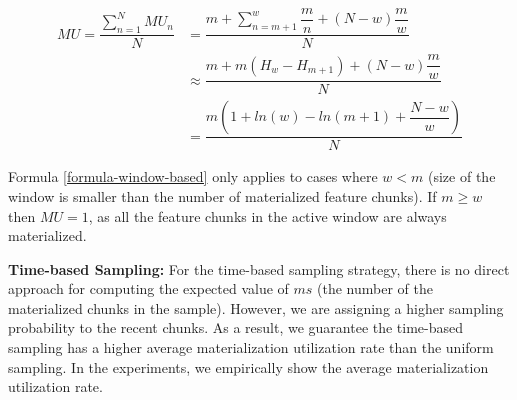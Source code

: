 \begin{equation} \label{formula-window-based}
\begin{aligned}
MU=\dfrac{\sum\limits_{n=1}^N MU_n}{N}
&=\dfrac{m + \sum\limits_{n = m+1}^{w} \dfrac{m}{n} + (N-w)\dfrac{m}{w} }{N} \\
&\approx\dfrac{m  +  m (H_w - H_{m+1}) + (N-w)\dfrac{m}{w}}{N}\\
&=\dfrac{m(1 + ln(w) - ln(m+1) + \dfrac{N-w}{w})}{N}
\end{aligned}
\end{equation}

Formula \ref{formula-window-based} only applies to cases where $w<m$ (size of the window is smaller than the number of materialized feature chunks).
If $m \geq w$ then $MU=1$, as all the feature chunks in the active window are always materialized.

\textbf{Time-based Sampling:}
For the time-based sampling strategy, there is no direct approach for computing the expected value of $ms$ (the number of the materialized chunks in the sample).
However, we are assigning a higher sampling probability to the recent chunks.
As a result, we guarantee the time-based sampling has a higher average materialization utilization rate than the uniform sampling.
In the experiments, we empirically show the average materialization utilization rate.


